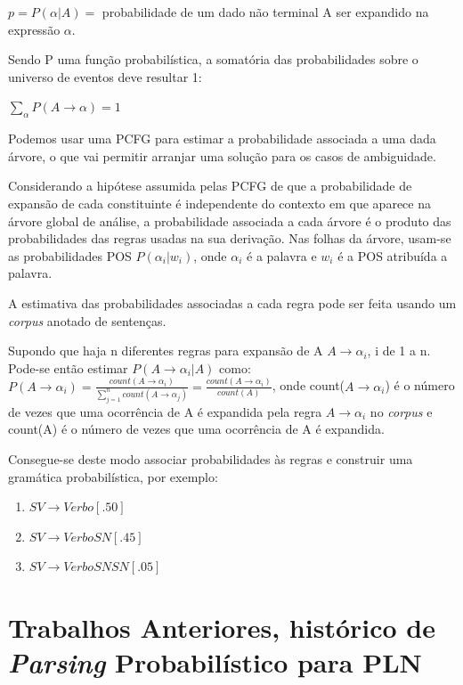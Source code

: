 $p=P(\alpha |A) = $ probabilidade de um dado não terminal A ser expandido na expressão $ \alpha. $

Sendo P uma função probabilística, a somatória das probabilidades sobre o universo de eventos deve resultar 1: 

$\sum_\alpha P(A \rightarrow \alpha)=1 $

Podemos usar uma PCFG para estimar a probabilidade associada a uma dada árvore, o que vai permitir arranjar uma solução para os casos de ambiguidade. 

Considerando a hipótese assumida pelas PCFG de que a probabilidade de expansão de cada constituinte é independente do contexto em que aparece na árvore global de análise, a probabilidade associada a cada árvore é o produto das probabilidades das regras usadas na sua derivação. Nas folhas da árvore, usam-se as probabilidades POS $P(\alpha_i|w_i)$, onde  $\alpha_i$ é a palavra e $w_i$ é a POS atribuída a palavra.

A estimativa das probabilidades associadas a cada regra pode ser feita usando um \emph{corpus} anotado de sentenças.

Supondo que haja n diferentes regras para expansão de A $A \rightarrow \alpha_i $, i de 1 a n.
\\
Pode-se então estimar $P(A \rightarrow \alpha_i|A)$ como:
\\

$ P(A \rightarrow \alpha_i) = \frac{count(A \rightarrow \alpha_i)}{\sum_{j=1}^n count(A \rightarrow \alpha_j)} = \frac{count(A \rightarrow \alpha_i)}{count(A)} $, onde count($A \rightarrow \alpha_i$) é o número de vezes que uma ocorrência de A é expandida pela regra $A \rightarrow \alpha_i$ no \emph{corpus} e count(A) é o número de vezes que uma ocorrência de A é expandida.

Consegue-se deste modo associar probabilidades às regras e construir uma gramática probabilística, por exemplo:

\begin{enumerate}
  \item  $SV \rightarrow Verbo [.50]$
  \item  $SV \rightarrow Verbo SN [.45]$
  \item  $SV \rightarrow Verbo SN SN [.05]$
\end{enumerate}


\section{Trabalhos Anteriores, histórico de \emph{Parsing} Probabilístico para PLN}
\label{sec:trab_anter}

